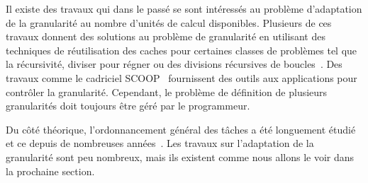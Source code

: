 Il existe des travaux qui dans le passé se sont intéressés au problème d'adaptation de la granularité au nombre d'unités de calcul disponibles.
%
Plusieurs de ces travaux donnent des solutions au problème de granularité en utilisant des techniques de réutilisation des caches pour certaines classes de problèmes tel que la récursivité, diviser pour régner ou des divisions récursives de boucles~\cite{unifieddataflow,Intel_TBB,Cilk,xkaapi,taskscomparison}.
%
Des travaux comme le cadriciel SCOOP~\cite{scoopp} fournissent des outils aux applications pour contrôler la granularité.
%
Cependant, le problème de définition de plusieurs granularités doit toujours être géré par le programmeur.


Du côté théorique, l'ordonnancement général des tâches a été longuement étudié et ce depuis de nombreuses années~\cite{Khan94acomparison,heft}.
%
Les travaux sur l'adaptation de la granularité sont peu nombreux, mais ils existent comme nous allons le voir dans la prochaine section.

